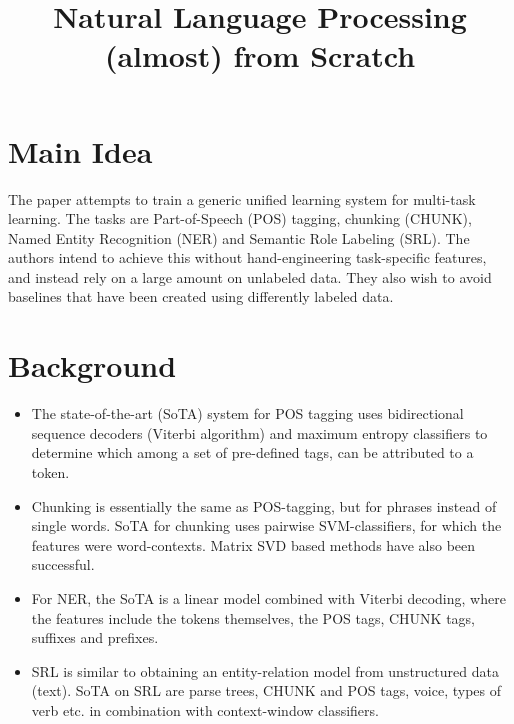 \documentclass[12pt]{scrartcl}
\begin{document}
\title{Natural Language Processing (almost) from Scratch}
\author{}
\date{}
\maketitle

\section{Main Idea}
  The paper \cite{collobert2011natural} attempts to train a generic unified learning system for multi-task learning. The tasks are Part-of-Speech (POS) tagging, chunking (CHUNK), Named Entity Recognition (NER) and Semantic Role Labeling (SRL). The authors intend to achieve this without hand-engineering task-specific features, and instead rely on a large amount on unlabeled data. They also wish to avoid baselines that have been created using differently labeled data.
  
\section{Background}
  \begin{itemize}
    \item The state-of-the-art (SoTA) system for POS tagging uses bidirectional sequence decoders (Viterbi algorithm) and maximum entropy classifiers to determine which among a set of pre-defined tags, can be attributed to a token.
    \item Chunking is essentially the same as POS-tagging, but for phrases instead of single words. SoTA for chunking uses pairwise SVM-classifiers, for which the features were word-contexts. Matrix SVD based methods have also been successful.
    \item For NER, the SoTA is a linear model combined with Viterbi decoding, where the features include the tokens themselves, the POS tags, CHUNK tags, suffixes and prefixes.
    \item SRL is similar to obtaining an entity-relation model from unstructured data (text). SoTA on SRL are parse trees, CHUNK and POS tags, voice, types of verb etc. in combination with context-window classifiers.
  \end{itemize}
\end{document}
